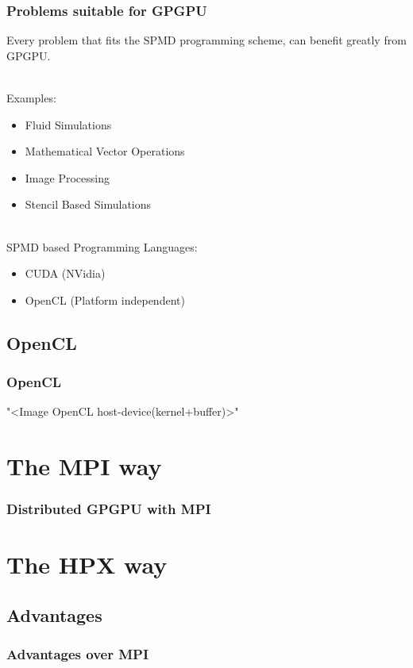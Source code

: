 \documentclass[t]{beamer}
\begin{document}
\begin{frame}
    \frametitle{Problems suitable for GPGPU}
    Every problem that fits the \alert{SPMD} programming scheme, can benefit greatly
    from GPGPU.
    
    ~\\ 
    Examples:
    \begin{itemize}
        \item Fluid Simulations
        \item Mathematical Vector Operations
        \item Image Processing
        \item Stencil Based Simulations 
    \end{itemize}
    
    ~\\
    SPMD based Programming Languages:
    \begin{itemize}
        \item CUDA (NVidia)
        \item OpenCL (Platform independent)
    \end{itemize}
\end{frame}

\subsection{OpenCL}
\begin{frame}
    \frametitle{OpenCL}
    "<Image OpenCL host-device(kernel+buffer)>" 
\end{frame}

\section{The MPI way}

\begin{frame}
    \frametitle{Distributed GPGPU with MPI}
\end{frame}




\section{The HPX way}

\subsection{Advantages}
\begin{frame}
    \frametitle{Advantages over MPI}
\end{frame}
\end{document}
